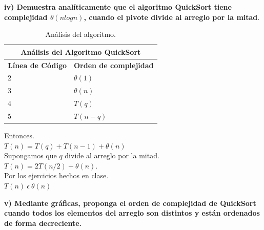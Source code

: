 \documentclass[12pt]{report}
\begin{document}
	\textbf{iv) Demuestra analíticamente que el algoritmo QuickSort tiene complejidad $\theta (nlogn)$, cuando el pivote divide al arreglo por la mitad}.\\
	
	\begin{table}[htbp]
		\begin{center}
			\begin{tabular}{|l|l|}
				\hline
				\multicolumn{2}{|c|}{Análisis del Algoritmo QuickSort} \\ 
				\hline
				\textbf{Línea de Código} & \textbf{Orden de complejidad}\\
				\hline
				2 & $\theta (1)$ \\ \hline
				3 & $\theta (n)$ \\ \hline
				4 & $T (q)$ \\ \hline
				5 & $T(n-q)$ \\ \hline
			\end{tabular}
			\caption{Análisis del algoritmo.}
			\label{tabla:analisis2}
		\end{center}
	\end{table} 
	Entonces.\\
	$T(n)=T(q)+T(n-1)+\theta(n)$\\
	Supongamos que $q$ divide al arreglo por la mitad.\\
	$T(n)=2T(n/2)+\theta(n)$.\\
	Por los ejercicios hechos en clase.\\
	$T(n) \ \epsilon \ \theta(n)$
	
	
	\newpage
	
	\textbf{v) Mediante gráficas, proponga el orden de complejidad de QuickSort cuando todos los elementos del arreglo son distintos y están ordenados de forma decreciente.}\\
	
\end{document}
